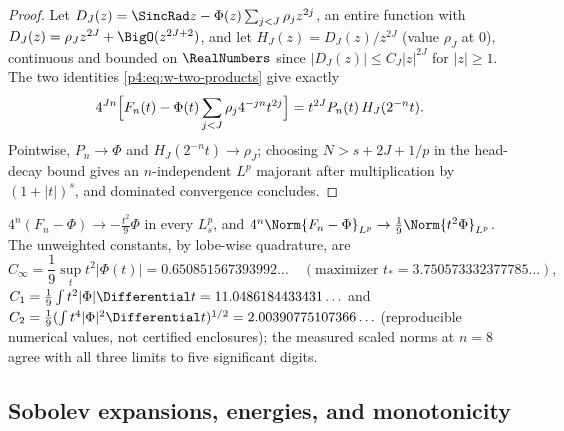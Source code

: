 \documentclass[11pt,oneside]{article}
\numberwithin{equation}{section}
\theoremstyle{definition}
\theoremstyle{remark}
\begin{document}
\begin{proof}
Let $D_J(z)=\SincRad z-\Phi(z)\sum_{j<J}\rho_jz^{2j}$, an entire function with
$D_J(z)=\rho_Jz^{2J}+\BigO(z^{2J+2})$, and let $H_J(z)=D_J(z)/z^{2J}$
(value $\rho_J$ at $0$), continuous and bounded on $\RealNumbers$ since
$|D_J(z)|\le C_J|z|^{2J}$ for $|z|\ge1$.  The two identities
\eqref{p4:eq:w-two-products} give exactly
\[
 4^{Jn}\Bigl[F_n(t)-\Phi(t)\sum_{j<J}\rho_j4^{-jn}t^{2j}\Bigr]
 =t^{2J}P_n(t)\,H_J(2^{-n}t).
\]
Pointwise, $P_n\to\Phi$ and $H_J(2^{-n}t)\to\rho_J$; choosing
$N>s+2J+1/p$ in the head-decay bound gives an $n$-independent $L^p$
majorant after multiplication by $(1+|t|)^s$, and dominated convergence
concludes.
\end{proof}

\begin{corollary}
\label{p4:cor:w-leading}
$4^n(F_n-\Phi)\to-\tfrac{t^2}9\Phi$ in every $L^p_s$, and
$4^n\Norm{F_n-\Phi}_{L^p}\to\tfrac19\Norm{t^2\Phi}_{L^p}$.  The unweighted
constants, by lobe-wise quadrature, are
\begin{equation}
 C_\infty=\frac19\sup_t t^2|\Phi(t)|=0.650851567393992\ldots
 \quad(\text{maximizer }t_*=3.750573332377785\ldots),
 \label{p4:eq:w-Cinf}
\end{equation}
$C_1=\tfrac19\int t^2|\Phi|\Differential t=11.0486184433431\ldots$ and
$C_2=\tfrac19(\int t^4|\Phi|^2\Differential t)^{1/2}=2.00390775107366\ldots$
(reproducible numerical values, not certified enclosures); the measured
scaled norms at $n=8$ agree with all three limits to five significant
digits.
\end{corollary}

\subsection{Sobolev expansions, energies, and monotonicity}
\end{document}
